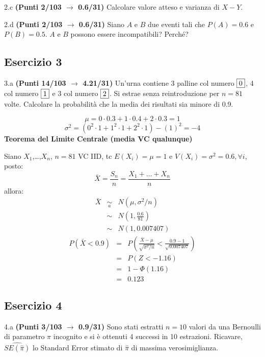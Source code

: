 \documentclass[
  11pt,
]{book}
\theoremstyle{mytheoremstyle}
\theoremstyle{mydefstyle}
\newenvironment{sol}
  {
  \begin{tcolorbox}[enhanced,breakable,arc=0.1mm,boxrule=1pt,colback=white,colframe=iblue,
  title=\bf \fontfamily{lmss}\selectfont \hspace{.5 cm} Soluzione,drop fuzzy shadow]

}{
\end{tcolorbox}
  }
\begin{document}
2.c \textbf{(Punti 2/103 \(\rightarrow\) 0.6/31)} Calcolare valore atteso e varianza di \(X-Y\).

2.d \textbf{(Punti 2/103 \(\rightarrow\) 0.6/31)} Siano \(A\) e \(B\) due eventi tali che \(P(A)=0.6\) e \(P(B)=0.5\). \(A\) e \(B\) possono essere incompatibili? Perché?

\subsection{Esercizio 3}\label{esercizio-3-27}

3.a \textbf{(Punti 14/103 \(\rightarrow\) 4.21/31)} Un'urna contiene 3 palline col numero \(\fbox{0}\), 4 col numero \(\fbox{1}\) e 3 col numero \(\fbox{2}\). Si estrae senza reintroduzione per \(n=81\) volte.
Calcolare la probabilità che la media dei risultati sia minore di 0.9.

\begin{sol}
\[ \mu = 0 \cdot 0.3+1 \cdot 0.4+2 \cdot 0.3 = 1 \]\[ \sigma^2 =( 0^2 \cdot 1+1^2 \cdot 1+2^2 \cdot 1 )-( 1 )^2= -4 \]\textbf{Teorema del Limite Centrale (media VC qualunque)}

Siano \(X_1\),\ldots,\(X_n\), \(n=81\) VC IID, tc \(E(X_i)=\mu=1\) e \(V(X_i)=\sigma^2=0.6,\forall i\), posto:
\[
      \bar X=\frac{S_n}n =\frac{X_1 + ... + X_n}n
      \]
allora:\begin{eqnarray*}
  \bar X & \mathop{\sim}\limits_{a}& N(\mu,\sigma^2/n) \\
     &\sim & N\left(1,\frac{0.6}{81}\right) \\
     &\sim & N(1,0.007407)
  \end{eqnarray*}\begin{eqnarray*}
      P( \bar X   <   0.9 ) 
        &=& P\left(  \frac { \bar X  -  \mu }{ \sqrt{\sigma^2/n} }  <  \frac { 0.9  -  1 }{\sqrt{ 0.007407 }} \right)  \\
                 &=& P\left(  Z   <   -1.16 \right) \\    
                 &=&  1-\Phi( 1.16 ) \\ &=&  0.123 
      \end{eqnarray*}

\end{sol}

\subsection{Esercizio 4}\label{esercizio-4-27}

4.a \textbf{(Punti 3/103 \(\rightarrow\) 0.9/31)} Sono stati estratti \(n=10\) valori da una Bernoulli di parametro \(\pi\) incognito e si è ottenuti 4 successi in 10 estrazioni. Ricavare, \(\widehat{SE(\hat\pi)}\) lo Standard Error stimato di \(\hat\pi\) di massima verosimiglianza.
\end{document}
